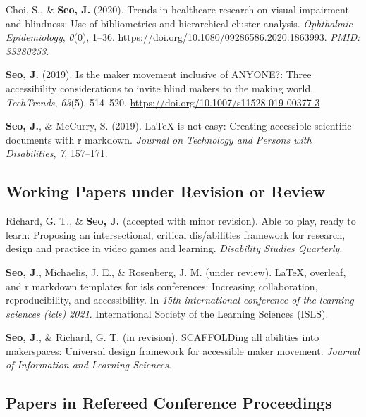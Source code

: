 \documentclass[11pt, a4paper]{awesome-cv}
\begin{document}
\hypertarget{refs_journals}{}
\leavevmode\hypertarget{ref-doi:10.1080ux2f09286586.2020.1863993}{}%
Choi, S., \& \textbf{Seo, J.} (2020). Trends in healthcare research on
visual impairment and blindness: Use of bibliometrics and hierarchical
cluster analysis. \emph{Ophthalmic Epidemiology}, \emph{0}(0), 1--36.
\url{https://doi.org/10.1080/09286586.2020.1863993}. \emph{PMID:
33380253}.

\leavevmode\hypertarget{ref-seo2019maker}{}%
\textbf{Seo, J.} (2019). Is the maker movement inclusive of ANYONE?:
Three accessibility considerations to invite blind makers to the making
world. \emph{TechTrends}, \emph{63}(5), 514--520.
\url{https://doi.org/10.1007/s11528-019-00377-3}

\leavevmode\hypertarget{ref-seo2019arow}{}%
\textbf{Seo, J.}, \& McCurry, S. (2019). LaTeX is not easy: Creating
accessible scientific documents with r markdown. \emph{Journal on
Technology and Persons with Disabilities}, \emph{7}, 157--171.

\hypertarget{working-papers-under-revision-or-review}{%
\subsection{Working Papers under Revision or
Review}\label{working-papers-under-revision-or-review}}

\hypertarget{refs_working_paper}{}
\leavevmode\hypertarget{ref-dsq}{}%
Richard, G. T., \& \textbf{Seo, J.} (accepted with minor revision). Able
to play, ready to learn: Proposing an intersectional, critical
dis/abilities framework for research, design and practice in video games
and learning. \emph{Disability Studies Quarterly}.

\leavevmode\hypertarget{ref-seo2021islsdown}{}%
\textbf{Seo, J.}, Michaelis, J. E., \& Rosenberg, J. M. (under review).
LaTeX, overleaf, and r markdown templates for isls conferences:
Increasing collaboration, reproducibility, and accessibility. In
\emph{15th international conference of the learning sciences (icls)
2021}. International Society of the Learning Sciences (ISLS).

\leavevmode\hypertarget{ref-scaffold}{}%
\textbf{Seo, J.}, \& Richard, G. T. (in revision). SCAFFOLDing all
abilities into makerspaces: Universal design framework for accessible
maker movement. \emph{Journal of Information and Learning Sciences}.

\hypertarget{papers-in-refereed-conference-proceedings}{%
\subsection{Papers in Refereed Conference
Proceedings}\label{papers-in-refereed-conference-proceedings}}
\end{document}
